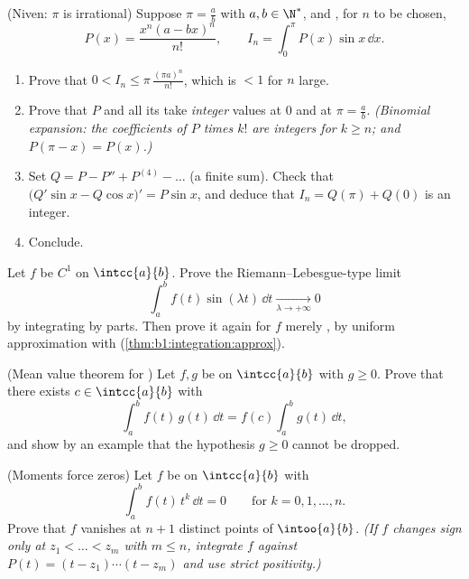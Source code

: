 \begin{exercise}[$\star\star\star$]\label{exo:b1:integration:9}
(Niven: $\pi$ is irrational) Suppose $\pi = \frac ab$ with $a, b \in
\N^*$, and , for $n$ to be chosen,
\[
P(x) = \frac{x^n (a - bx)^n}{n!},
\qquad
I_n = \int_0^{\pi} P(x)\sin x\, \dd x .
\]
\begin{enumerate}
  \item Prove that $0 < I_n \leq \pi\,\frac{(\pi a)^n}{n!}$, which is
        $< 1$ for $n$ large.
  \item Prove that $P$ and all its  take \emph{integer}
        values at $0$ and at $\pi = \frac ab$. \emph{(Binomial
        expansion: the coefficients of $P$ times $k!$ are integers
        for $k \geq n$; and $P(\pi - x) = P(x)$.)}
  \item Set $Q = P - P'' + P^{(4)} - \dots$ (a finite sum). Check
        that $\bigl(Q'\sin x - Q\cos x\bigr)' = P \sin x$, and deduce
        that $I_n = Q(\pi) + Q(0)$ is an integer.
  \item Conclude.
\end{enumerate}
\end{exercise}

\begin{exercise}[$\star\star\star$]\label{exo:b1:integration:10}
Let $f$ be $C^1$ on $\intcc{a}{b}$. Prove the Riemann--Lebesgue-type
limit
\[
\int_a^b f(t)\sin(\lambda t)\,\dd t \xrightarrow[\lambda \to
+\infty]{} 0
\]
by integrating by parts. Then prove it again for $f$ merely
, by uniform approximation with 
(\cref{thm:b1:integration:approx}).
\end{exercise}

\begin{exercise}[$\star\star$]\label{exo:b1:integration:11}
(Mean value theorem for ) Let $f, g$ be  on
$\intcc{a}{b}$ with $g \geq 0$. Prove that there exists $c \in
\intcc{a}{b}$ with
\[
\int_a^b f(t)\,g(t)\,\dd t = f(c)\int_a^b g(t)\,\dd t ,
\]
and show by an example that the hypothesis $g \geq 0$ cannot be
dropped.
\end{exercise}

\begin{exercise}[$\star\star\star$]\label{exo:b1:integration:12}
(Moments force zeros) Let $f$ be  on $\intcc{a}{b}$
with
\[
\int_a^b f(t)\,t^k\,\dd t = 0 \qquad \text{for } k = 0, 1,
\dots, n .
\]
Prove that $f$ vanishes at $n + 1$ distinct points of
$\intoo{a}{b}$. \emph{(If $f$ changes sign only at $z_1 < \dots
< z_m$ with $m \leq n$, integrate $f$ against $P(t) = (t - z_1)
\cdots (t - z_m)$ and use strict positivity.)}
\end{exercise}


